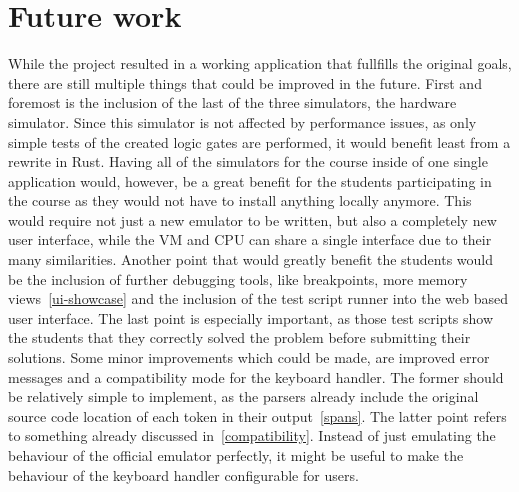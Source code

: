 \section{Future work}
\label{future-work}
While the project resulted in a working application that fullfills the original goals, there are still multiple things that could be improved in the future.
First and foremost is the inclusion of the last of the three simulators, the hardware simulator.
Since this simulator is not affected by performance issues, as only simple tests of the created logic gates are performed, it would benefit least from a rewrite in Rust.
Having all of the simulators for the course inside of one single application would, however, be a great benefit for the students participating in the course as they would not have to install anything locally anymore.
This would require not just a new emulator to be written, but also a completely new user interface, while the VM and CPU can share a single interface due to their many similarities.
Another point that would greatly benefit the students would be the inclusion of further debugging tools, like breakpoints, more memory views~\ref{ui-showcase} and the inclusion of the test script runner into the web based user interface.
The last point is especially important, as those test scripts show the students that they correctly solved the problem before submitting their solutions.
Some minor improvements which could be made, are improved error messages and a compatibility mode for the keyboard handler.
The former should be relatively simple to implement, as the parsers already include the original source code location of each token in their output~\ref{spans}.
The latter point refers to something already discussed in~\cref{compatibility}.
Instead of just emulating the behaviour of the official emulator perfectly, it might be useful to make the behaviour of the keyboard handler configurable for users.

